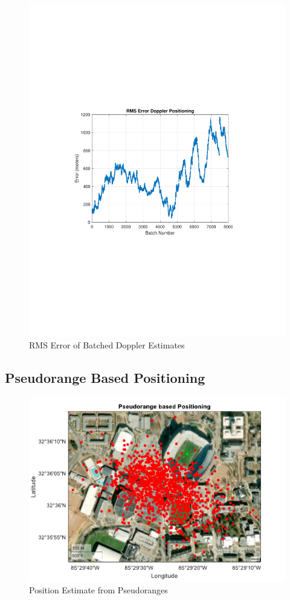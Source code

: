 \documentclass[12pt]{report}
\begin{document}
\begin{figure}[h!]
    \centering
    \includegraphics[trim=1.2in 3.3in 1.75in 3.3in,clip,width=5in]{Iridium RMSE plot Doppler Cleanest file.pdf}
    \caption{RMS Error of Batched Doppler Estimates}
    \label{fig:RMSErrorBatchDoppler}
\end{figure}

\subsection{Pseudorange Based Positioning}
\begin{figure}[h!]
    \centering
    \includegraphics[width=5in]
    {15min_irid_clean_pseudorangebased.pdf}
    \caption{Position Estimate from Pseudoranges}
    \label{fig:CleanPseudo15minIridPosit}
\end{figure}
\end{document}
